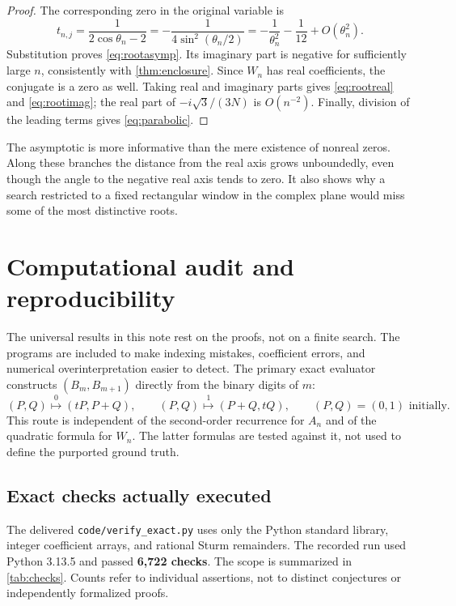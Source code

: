 \documentclass[11pt]{article}
\numberwithin{equation}{section}
\theoremstyle{definition}
\begin{document}
\begin{proof}
The corresponding zero in the original variable is
\[
 t_{n,j}=\frac1{2\cos\theta_n-2}
        =-\frac1{4\sin^2(\theta_n/2)}
        =-\frac1{\theta_n^2}-\frac1{12}+O(\theta_n^2).
\]
Substitution proves \eqref{eq:rootasymp}.  Its imaginary part is negative
for sufficiently large $n$, consistently with \cref{thm:enclosure}.
Since $W_n$ has real coefficients, the conjugate is a zero as well.
Taking real and imaginary parts gives \eqref{eq:rootreal} and
\eqref{eq:rootimag}; the real part of $-i\sqrt3/(3N)$ is $O(n^{-2})$.
Finally, division of the leading terms gives \eqref{eq:parabolic}.
\end{proof}

The asymptotic is more informative than the mere existence of nonreal
zeros.  Along these branches the distance from the real axis grows
unboundedly, even though the angle to the negative real axis tends to zero.
It also shows why a search restricted to a fixed rectangular window in the
complex plane would miss some of the most distinctive roots.

\section{Computational audit and reproducibility}\label{sec:computation}

The universal results in this note rest on the proofs, not on a finite
search.  The programs are included to make indexing mistakes, coefficient
errors, and numerical overinterpretation easier to detect.
The primary exact evaluator constructs $(B_m,B_{m+1})$ directly from the
binary digits of $m$:
\[
 (P,Q)\stackrel{0}{\longmapsto}(tP,P+Q),\qquad
 (P,Q)\stackrel{1}{\longmapsto}(P+Q,tQ),\qquad (P,Q)=(0,1)\text{ initially}.
\]
This route is independent of the second-order recurrence for $A_n$ and of
the quadratic formula for $W_n$.  The latter formulas are tested against it,
not used to define the purported ground truth.

\subsection{Exact checks actually executed}

The delivered \texttt{code/verify\_exact.py} uses only the Python standard
library, integer coefficient arrays, and rational Sturm remainders.
The recorded run used Python 3.13.5 and passed \textbf{6,722 checks}.
The scope is summarized in \cref{tab:checks}.  Counts refer to individual
assertions, not to distinct conjectures or independently formalized proofs.
\end{document}
